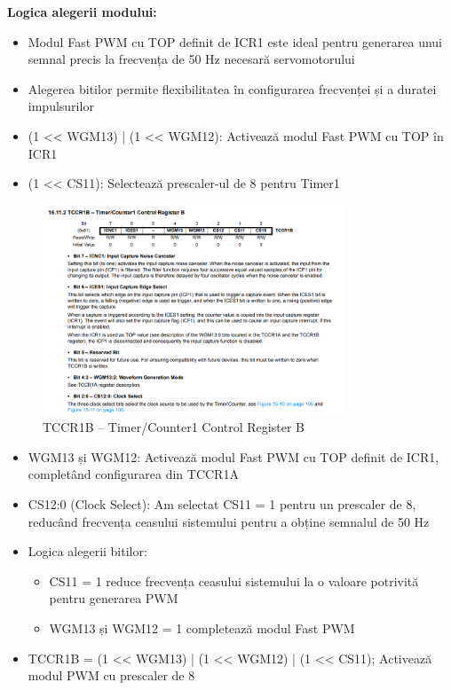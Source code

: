 \documentclass{report}
\begin{document}
 \textbf{Logica alegerii modului:}
 \begin{itemize}
     \item Modul Fast PWM cu TOP definit de ICR1 este ideal pentru generarea unui semnal precis la frecvența de 50 Hz necesară servomotorului
     \item Alegerea bitilor permite flexibilitatea în configurarea frecvenței și a duratei impulsurilor
     \item (1 << WGM13) | (1 << WGM12): Activează modul Fast PWM cu TOP în ICR1
     \item (1 << CS11): Selectează prescaler-ul de 8 pentru Timer1
 \end{itemize}
\newpage
\vspace*{1cm}
 \begin{figure}[H]
    \centering
    \includegraphics[width=0.8\textwidth]{tccr1B.png}
    \caption{TCCR1B – Timer/Counter1 Control Register B}
    \label{fig:TCCR1B}
\end{figure}

\begin{itemize}
    \item WGM13 și WGM12: Activează modul Fast PWM cu TOP definit de ICR1, completând configurarea din TCCR1A
    \item CS12:0 (Clock Select): Am selectat CS11 = 1 pentru un prescaler de 8, reducând frecvența ceasului sistemului pentru a obține semnalul de 50 Hz
    \item Logica alegerii bitilor:
        \begin{itemize}
            \item CS11 = 1 reduce frecvența ceasului sistemului la o valoare potrivită pentru generarea PWM
            \item WGM13 și WGM12 = 1 completează modul Fast PWM
        \end{itemize}
    \item TCCR1B = (1 << WGM13) | (1 << WGM12) | (1 << CS11); Activează modul PWM cu prescaler de 8

\end{itemize}
\end{document}
